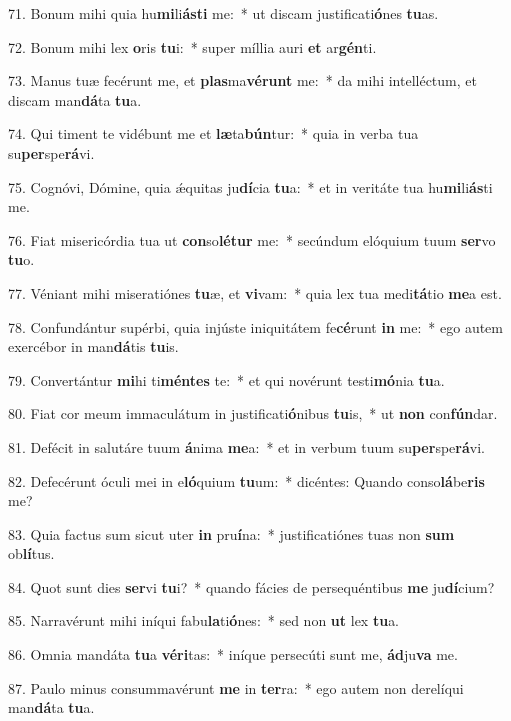 71. Bonum mihi quia hu\textbf{mi}li\textbf{ás}\textbf{ti} me:~*  ut discam justificati\textbf{ó}nes \textbf{tu}as.\

72. Bonum mihi lex \textbf{o}ris \textbf{tu}i:~*  super míllia auri \textbf{et} ar\textbf{gén}ti.\

73. Manus tuæ fecérunt me, et \textbf{plas}ma\textbf{vé}\textbf{runt} me:~*  da mihi intelléctum, et discam man\textbf{dá}ta \textbf{tu}a.\

74. Qui timent te vidébunt me et \textbf{læ}ta\textbf{bún}tur:~*  quia in verba tua su\textbf{per}spe\textbf{rá}vi.\

75. Cognóvi, Dómine, quia ǽquitas ju\textbf{dí}cia \textbf{tu}a:~*  et in veritáte tua hu\textbf{mi}li\textbf{ás}ti me.\

76. Fiat misericórdia tua ut \textbf{con}so\textbf{lé}\textbf{tur} me:~*  secúndum elóquium tuum \textbf{ser}vo \textbf{tu}o.\

77. Véniant mihi miseratiónes \textbf{tu}æ, et \textbf{vi}vam:~*  quia lex tua medi\textbf{tá}tio \textbf{me}a est.\

78. Confundántur supérbi, quia injúste iniquitátem fe\textbf{cé}runt \textbf{in} me:~*  ego autem exercébor in man\textbf{dá}tis \textbf{tu}is.\

79. Convertántur \textbf{mi}hi ti\textbf{mén}\textbf{tes} te:~*  et qui novérunt testi\textbf{mó}nia \textbf{tu}a.\

80. Fiat cor meum immaculátum in justificati\textbf{ó}nibus \textbf{tu}is,~*  ut \textbf{non} con\textbf{fún}dar.\

81. Defécit in salutáre tuum \textbf{á}nima \textbf{me}a:~*  et in verbum tuum su\textbf{per}spe\textbf{rá}vi.\

82. Defecérunt óculi mei in e\textbf{ló}quium \textbf{tu}um:~*  dicéntes: Quando conso\textbf{lá}be\textbf{ris} me?\

83. Quia factus sum sicut uter \textbf{in} pru\textbf{í}na:~*  justificatiónes tuas non \textbf{sum} ob\textbf{lí}tus.\

84. Quot sunt dies \textbf{ser}vi \textbf{tu}i?~*  quando fácies de persequéntibus \textbf{me} ju\textbf{dí}cium?\

85. Narravérunt mihi iníqui fabu\textbf{la}ti\textbf{ó}nes:~*  sed non \textbf{ut} lex \textbf{tu}a.\

86. Omnia mandáta \textbf{tu}a \textbf{vé}\textbf{ri}tas:~*  iníque persecúti sunt me, \textbf{ád}ju\textbf{va} me.\

87. Paulo minus consummavérunt \textbf{me} in \textbf{ter}ra:~*  ego autem non derelíqui man\textbf{dá}ta \textbf{tu}a.\

